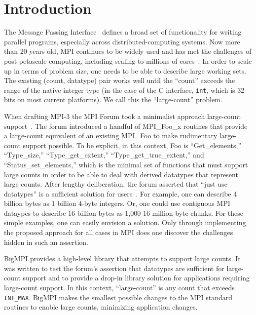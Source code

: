 
\section{Introduction}
\label{sec:intro}

The Message Passing Interface~\cite{mpiforum:94, mpiforum:96, mpiforum:09, mpiforum:12} 
defines a broad set of functionality for writing parallel programs, especially across
distributed-computing systems.
Now more than 20 years old, MPI continues to be widely used and has met the challenges of
post-petascale computing, including scaling to millions of cores~\cite{balaji2011mpi}. 
In order to scale up in terms of problem size, one needs
to be able to describe large working sets.  The existing (count, datatype) pair
works well until the ``count'' exceeds the range of the native integer type
(in the case of the C interface, \texttt{int}, which is 32 bits on most current platforms).
We call this the ``large-count'' problem.

When drafting MPI-3 the MPI Forum took a minimalist approach large-count 
support~\cite{ticket265}.
The forum introduced a handful of MPI\_Foo\_x routines that provide a large-count
equivalent of an existing MPI\_Foo to make rudimentary large-count support possible.
To be explicit, in this context, Foo is ``Get\_elements,'' ``Type\_size,'' ``Type\_get\_extent,'' 
``Type\_get\_true\_extent,'' and ``Status\_set\_elements,'' which is the minimal set
of functions that must support large counts in order to be able to deal 
with derived datatypes that represent large counts.
After lengthy deliberation, the forum asserted that ``just use datatypes'' is 
a sufficient solution for users~\cite{squyres-blog-large-count}.
For example, one can describe 4 billion bytes as 1 billion 4-byte integers.
Or, one could use contiguous MPI dataypes to describe 16 billion bytes as 1,000
16 million-byte chunks.  For these simple examples, one can easily envision a
solution. Only through implementing the proposed approach for all cases
in MPI does one discover the challenges hidden in such an assertion.

BigMPI provides a high-level library that attempts to support large counts.
It was written to test the forum's assertion
that datatypes are sufficient for large-count support and to provide a drop-in library
solution for applications requiring large-count support.
In this context, ``large-count'' is any count that exceeds \texttt{INT\_MAX}.
BigMPI makes the smallest possible changes to the MPI standard routines to
enable large counts, minimizing application changes.

